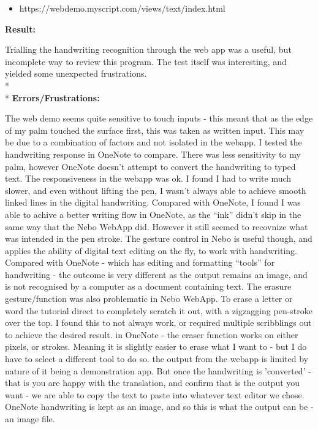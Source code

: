 \documentclass{article}
\begin{document}
\begin{itemize}
    \item https://webdemo.myscript.com/views/text/index.html
\end{itemize}

\textbf{Result:}

Trialling the handwriting recognition through the web app was a useful, but incomplete way to review this program. The test itself was interesting, and yielded some unexpected frustrations. 
\\*
\\*
\label{Error: Nebo Errors/Frustrations}
\textbf{Errors/Frustrations:}
\begin{outline}
    \1 The web demo seems quite sensitive to touch inputs - this meant that as the edge of my palm touched the surface first, this was taken as written input. 
        \2 This may be due to a combination of factors and not isolated in the webapp. I tested the handwriting response in OneNote to compare. There was less sensitivity to my palm, however OneNote doesn't attempt to convert the handwriting to typed text.
    \1 The responsiveness in the webapp was ok. I found I had to write much slower, and even without lifting the pen, I wasn't always able to achieve smooth linked lines in the digital handwriting.
        \2 Compared with OneNote, I found I was able to achive a better writing flow in OneNote, as the ``ink'' didn't skip in the same way that the Nebo WebApp did. However it still seemed to recovnize what was intended in the pen stroke.
    \1 The gesture control in Nebo is useful though, and applies the ability of digital text editing on the fly, to work with handwriting.
        \2 Compared with OneNote - which has editing and formatting ``tools'' for handwriting - the outcome is very different as the output remains an image, and is not recognised by a computer as a document containing text.
    \1 The erasure gesture/function was also problematic in Nebo WebApp. To erase a letter or word the tutorial direct to completely scratch it out, with a zigzagging pen-stroke over the top. I found this to not always work, or required multiple scribblings out to achieve the desired result.
        \2 in OneNote - the eraser function works on either pixels, or strokes. Meaning it is slightly easier to erase what I want to - but I do have to select a different tool to do so.
    \1 the output from the webapp is limited by nature of it being a demonstration app. But once the handwriting is 'converted' - that is you are happy with the translation, and confirm that is the output you want - we are able to copy the text to paste into whatever text editor we chose.     \2 OneNote handwriting is kept as an image, and so this is what the output can be - an image file. 
\end{outline}
\end{document}
